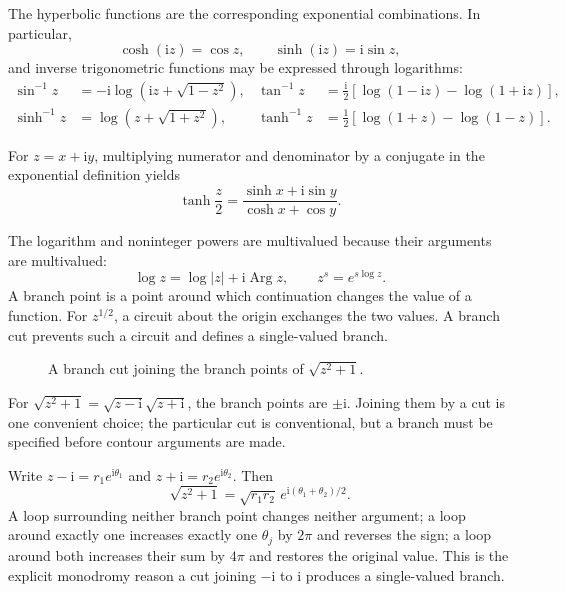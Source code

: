 The hyperbolic functions are the corresponding exponential combinations. In particular,
\begin{equation}
\cosh(\mathrm{i}z)=\cos z,\qquad \sinh(\mathrm{i}z)=\mathrm{i}\sin z,
\end{equation}
and inverse trigonometric functions may be expressed through logarithms:
\begin{align}
\sin^{-1}z&=-\mathrm{i}\log\left(\mathrm{i}z+\sqrt{1-z^2}\right),&
\tan^{-1}z&=\frac{\mathrm{i}}{2}\left[\log(1-\mathrm{i}z)-\log(1+\mathrm{i}z)\right],\\
\sinh^{-1}z&=\log\left(z+\sqrt{1+z^2}\right),&
\tanh^{-1}z&=\frac12\left[\log(1+z)-\log(1-z)\right].
\end{align}

\begin{example}
For $z=x+\mathrm{i}y$, multiplying numerator and denominator by a conjugate in the exponential definition yields
\begin{equation}
\tanh\frac{z}{2}=\frac{\sinh x+\mathrm{i}\sin y}{\cosh x+\cos y}.
\end{equation}
\end{example}

The logarithm and noninteger powers are multivalued because their arguments are multivalued:
\begin{equation}
\log z=\log|z|+\mathrm{i}\operatorname{Arg}z,
\qquad z^s=e^{s\log z}.
\end{equation}
A branch point is a point around which continuation changes the value of a function. For $z^{1/2}$, a circuit about the origin exchanges the two values. A branch cut prevents such a circuit and defines a single-valued branch.

\begin{figure}[htb]
    \centering
    \caption{A branch cut joining the branch points of $\sqrt{z^2+1}$.}
    \label{fig:ch06-branch-cut}
\end{figure}

For $\sqrt{z^2+1}=\sqrt{z-\mathrm{i}}\sqrt{z+\mathrm{i}}$, the branch points are $\pm\mathrm{i}$. Joining them by a cut is one convenient choice; the particular cut is conventional, but a branch must be specified before contour arguments are made.

Write $z-\mathrm{i}=r_1e^{\mathrm{i}\theta_1}$ and $z+\mathrm{i}=r_2e^{\mathrm{i}\theta_2}$. Then
\begin{equation}
\sqrt{z^2+1}=\sqrt{r_1r_2}\,e^{\mathrm{i}(\theta_1+\theta_2)/2}.
\end{equation}
A loop surrounding neither branch point changes neither argument; a loop around exactly one increases exactly one $\theta_j$ by $2\pi$ and reverses the sign; a loop around both increases their sum by $4\pi$ and restores the original value. This is the explicit monodromy reason a cut joining $-\mathrm{i}$ to $\mathrm{i}$ produces a single-valued branch.